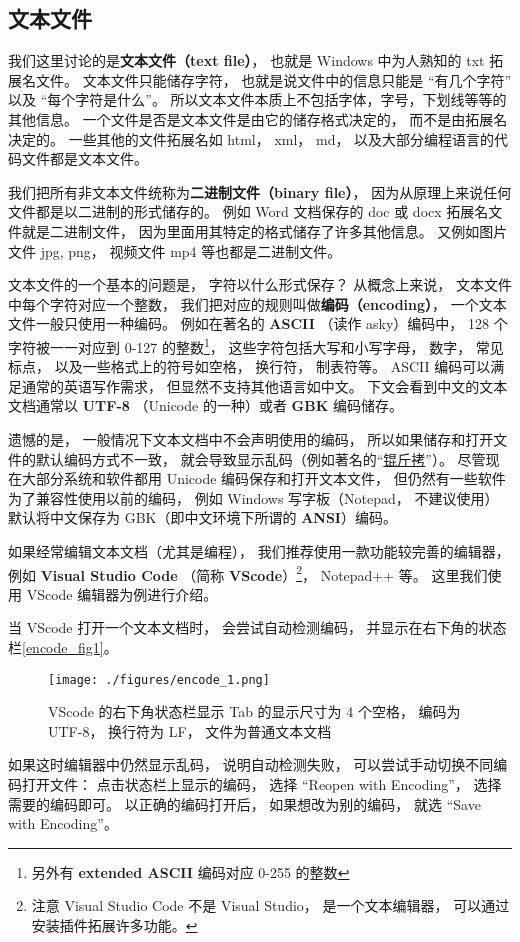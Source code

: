 
\subsection{文本文件}
我们这里讨论的是\textbf{文本文件（text file）}， 也就是 Windows 中为人熟知的 txt 拓展名文件。 文本文件只能储存字符， 也就是说文件中的信息只能是 “有几个字符” 以及 “每个字符是什么”。 所以文本文件本质上不包括字体，字号，下划线等等的其他信息。 一个文件是否是文本文件是由它的储存格式决定的， 而不是由拓展名决定的。 一些其他的文件拓展名如 html， xml， md， 以及大部分编程语言的代码文件都是文本文件。

我们把所有非文本文件统称为\textbf{二进制文件（binary file）}， 因为从原理上来说任何文件都是以二进制的形式储存的。 例如 Word 文档保存的 doc 或 docx 拓展名文件就是二进制文件， 因为里面用其特定的格式储存了许多其他信息。  又例如图片文件 jpg, png， 视频文件 mp4 等也都是二进制文件。

文本文件的一个基本的问题是， 字符以什么形式保存？ 从概念上来说， 文本文件中每个字符对应一个整数， 我们把对应的规则叫做\textbf{编码（encoding）}， 一个文本文件一般只使用一种编码。 例如在著名的 \textbf{ASCII} （读作 asky）编码中， 128 个字符被一一对应到 0-127 的整数\footnote{另外有 \textbf{extended ASCII} 编码对应 0-255 的整数}， 这些字符包括大写和小写字母， 数字， 常见标点， 以及一些格式上的符号如空格， 换行符， 制表符等。 ASCII 编码可以满足通常的英语写作需求， 但显然不支持其他语言如中文。 下文会看到中文的文本文档通常以 \textbf{UTF-8} （Unicode 的一种）或者 \textbf{GBK} 编码储存。

遗憾的是， 一般情况下文本文档中不会声明使用的编码， 所以如果储存和打开文件的默认编码方式不一致， 就会导致显示乱码（例如著名的“\href{https://baike.baidu.com/item/锟斤拷}{锟斤拷}”）。 尽管现在大部分系统和软件都用 Unicode 编码保存和打开文本文件， 但仍然有一些软件为了兼容性使用以前的编码， 例如 Windows 写字板（Notepad， 不建议使用）默认将中文保存为 GBK（即中文环境下所谓的 \textbf{ANSI}）编码。

如果经常编辑文本文档（尤其是编程）， 我们推荐使用一款功能较完善的编辑器， 例如 \textbf{Visual Studio Code} （简称 \textbf{VScode}）\footnote{注意 Visual Studio Code 不是 Visual Studio， 是一个文本编辑器， 可以通过安装插件拓展许多功能。}， Notepad++ 等。 这里我们使用 VScode 编辑器为例进行介绍。

当 VScode 打开一个文本文档时， 会尝试自动检测编码， 并显示在右下角的状态栏\autoref{encode_fig1}。
\begin{figure}[ht]
\centering
\texttt{[image: ./figures/encode\_1.png]}
\caption{VScode 的右下角状态栏显示 Tab 的显示尺寸为 4 个空格， 编码为 UTF-8， 换行符为 LF， 文件为普通文本文档} \label{encode_fig1}
\end{figure}
如果这时编辑器中仍然显示乱码， 说明自动检测失败， 可以尝试手动切换不同编码打开文件： 点击状态栏上显示的编码， 选择 “Reopen with Encoding”， 选择需要的编码即可。 以正确的编码打开后， 如果想改为别的编码， 就选 “Save with Encoding”。

